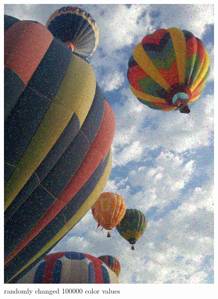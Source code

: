 \begin{figure}[ht]
\begin{minipage}[b]{0.45\linewidth}
\includegraphics[width=\textwidth]{baloons_resized_noisy.png}
\caption*{randomly changed 100000 color values}
\end{minipage}
\begin{minipage}[b]{0.45\linewidth}
\centering

\end{minipage}
\end{figure}
